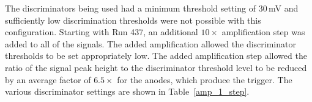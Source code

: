 The discriminators being used had a minimum threshold setting of 30\,mV and sufficiently low discrimination thresholds were not possible with this configuration. Starting with Run 437, an additional $10\times$ amplification step was added to all of the signals. The added amplification allowed the discriminator thresholds to be set appropriately low. The added amplification step allowed the ratio of the signal peak height to the discriminator threshold level to be reduced by an average factor of $6.5\times$ for the anodes, which produce the trigger. The various discriminator settings are shown in Table~\ref{amp_1_step}.
%
\renewcommand{\tabcolsep}{2pt}
